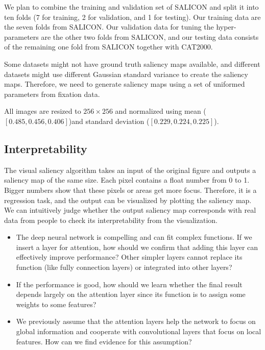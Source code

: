 \documentclass[12pt]{article}
\begin{document}
We plan to combine the training and validation set of SALICON
and split it into ten folds (7 for training, 2 for validation, and 1 for testing).
Our training data are the seven folds from SALICON.
Our validation data for tuning the hyper-parameters are the other two folds from SALICON,
and our testing data consists of the remaining one fold from SALICON together with CAT2000.

Some datasets might not have ground truth saliency maps available, and different datasets might use different Gaussian standard variance to create the saliency maps.
Therefore, we need to generate saliency maps using a set of uniformed parameters from fixation data.

All images are resized to $256 \times 256$ and normalized using mean ($[0.485, 0.456, 0.406]$)and standard deviation ($[0.229, 0.224, 0.225]$).



\subsection{Interpretability}

The visual saliency algorithm takes an input of the original figure and outputs a saliency map of the same size. Each pixel contains a float number from 0 to 1. Bigger numbers show that these pixels or areas get more focus. Therefore, it is a regression task, and the output can be visualized by plotting the saliency map. We can intuitively judge whether the output saliency map corresponds with real data from people to check its interpretability from the visualization.

\begin{itemize}
    \item The deep neural network is compelling and can fit complex functions. If we insert a layer for attention, how should we confirm that adding this layer can effectively improve performance? Other simpler layers cannot replace its function (like fully connection layers) or integrated into other layers?
    \item If the performance is good, how should we learn whether the final result depends largely on the attention layer since its function is to assign some weights to some features?
    \item We previously assume that the attention layers help the network to focus on global information and cooperate with convolutional layers that focus on local features. How can we find evidence for this assumption?
\end{itemize}
\end{document}
